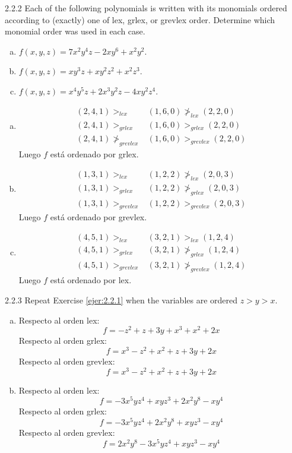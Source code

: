 \documentclass[twoside]{article}
\begin{document}
\begin{ejercicio}{2.2.2}
Each of the following polynomials is written with its monomials ordered according to (exactly) one of lex, grlex, or grevlex order. Determine which monomial order was used in each case.
\begin{enumerate}[a.]
\item $f(x,y,z) = 7x^2y^4z - 2xy^6 + x^2y^2$.
\item $f(x,y,z) = xy^3z + xy^2z^2 + x^2z^3$.
\item $f(x,y,z) = x^4y^5z + 2x^3y^2z - 4xy^2z^4$.
\end{enumerate}
\end{ejercicio}
\begin{solucion}\mbox{}
\begin{enumerate}[a.]
\item
\begin{align*}
(2,4,1) >_{lex} & (1,6,0) \not>_{lex} (2,2,0)\\
(2,4,1) >_{grlex} & (1,6,0) >_{grlex} (2,2,0)\\
(2,4,1) \not>_{grevlex} & (1,6,0) >_{grevlex} (2,2,0)
\end{align*}
Luego $f$ está ordenado por grlex.
\item
\begin{align*}
(1,3,1) >_{lex} & (1,2,2) \not>_{lex} (2,0,3)\\
(1,3,1) >_{grlex} & (1,2,2) \not>_{grlex} (2,0,3)\\
(1,3,1) >_{grevlex} & (1,2,2) >_{grevlex} (2,0,3)
\end{align*}
Luego $f$ está ordenado por grevlex.
\item
\begin{align*}
(4,5,1) >_{lex} & (3,2,1) >_{lex} (1,2,4)\\
(4,5,1) >_{grlex} & (3,2,1) \not>_{grlex} (1,2,4)\\
(4,5,1) >_{grevlex} & (3,2,1) \not>_{grevlex} (1,2,4)
\end{align*}
Luego $f$ está ordenado por lex.
\end{enumerate}
\end{solucion}

\newpage

\begin{ejercicio}{2.2.3}
Repeat Exercise \ref{ejer:2.2.1} when the variables are ordered $z > y > x$.
\end{ejercicio}
\begin{solucion}\mbox{}
\begin{enumerate}[a.]
\item Respecto al orden lex:
 \[ f = -z^2 + z + 3y + x^3 + x^2 + 2x \]
 Respecto al orden grlex:
 \[ f = x^3 - z^2 + x^2  + z + 3y + 2x \]
 Respecto al orden grevlex:
 \[ f = x^3 - z^2 + x^2  + z + 3y + 2x \]
\item Respecto al orden lex:
 \[ f = -3x^5yz^4 + xyz^3 + 2x^2y^8 - xy^4 \]
 Respecto al orden grlex:
 \[ f = -3x^5yz^4 + 2x^2y^8 + xyz^3 - xy^4 \]
 Respecto al orden grevlex:
 \[ f = 2x^2y^8 - 3x^5yz^4 + xyz^3 - xy^4 \]
\end{enumerate}
\end{solucion}
\end{document}

